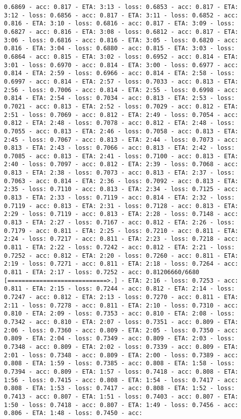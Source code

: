\documentclass[11pt]{article}
\begin{document}
\begin{Verbatim}[commandchars=\\\{\}]
0.6869 - acc: 0.817 - ETA: 3:13 - loss: 0.6853 - acc: 0.817 - ETA: 3:12 - loss: 0.6856 - acc: 0.817 - ETA: 3:11 - loss: 0.6852 - acc: 0.816 - ETA: 3:10 - loss: 0.6816 - acc: 0.817 - ETA: 3:09 - loss: 0.6827 - acc: 0.816 - ETA: 3:08 - loss: 0.6812 - acc: 0.817 - ETA: 3:06 - loss: 0.6816 - acc: 0.816 - ETA: 3:05 - loss: 0.6820 - acc: 0.816 - ETA: 3:04 - loss: 0.6880 - acc: 0.815 - ETA: 3:03 - loss: 0.6864 - acc: 0.815 - ETA: 3:02 - loss: 0.6952 - acc: 0.814 - ETA: 3:01 - loss: 0.6970 - acc: 0.814 - ETA: 3:00 - loss: 0.6977 - acc: 0.814 - ETA: 2:59 - loss: 0.6966 - acc: 0.814 - ETA: 2:58 - loss: 0.6997 - acc: 0.814 - ETA: 2:57 - loss: 0.7033 - acc: 0.813 - ETA: 2:56 - loss: 0.7006 - acc: 0.814 - ETA: 2:55 - loss: 0.6998 - acc: 0.814 - ETA: 2:54 - loss: 0.7034 - acc: 0.813 - ETA: 2:53 - loss: 0.7021 - acc: 0.813 - ETA: 2:52 - loss: 0.7029 - acc: 0.812 - ETA: 2:51 - loss: 0.7069 - acc: 0.812 - ETA: 2:49 - loss: 0.7054 - acc: 0.812 - ETA: 2:48 - loss: 0.7078 - acc: 0.812 - ETA: 2:48 - loss: 0.7055 - acc: 0.813 - ETA: 2:46 - loss: 0.7058 - acc: 0.813 - ETA: 2:45 - loss: 0.7067 - acc: 0.813 - ETA: 2:44 - loss: 0.7073 - acc: 0.813 - ETA: 2:43 - loss: 0.7066 - acc: 0.813 - ETA: 2:42 - loss: 0.7085 - acc: 0.813 - ETA: 2:41 - loss: 0.7100 - acc: 0.813 - ETA: 2:40 - loss: 0.7097 - acc: 0.812 - ETA: 2:39 - loss: 0.7068 - acc: 0.813 - ETA: 2:38 - loss: 0.7073 - acc: 0.813 - ETA: 2:37 - loss: 0.7063 - acc: 0.814 - ETA: 2:36 - loss: 0.7092 - acc: 0.813 - ETA: 2:35 - loss: 0.7110 - acc: 0.813 - ETA: 2:34 - loss: 0.7125 - acc: 0.813 - ETA: 2:33 - loss: 0.7119 - acc: 0.814 - ETA: 2:32 - loss: 0.7119 - acc: 0.813 - ETA: 2:31 - loss: 0.7128 - acc: 0.813 - ETA: 2:29 - loss: 0.7119 - acc: 0.813 - ETA: 2:28 - loss: 0.7148 - acc: 0.813 - ETA: 2:27 - loss: 0.7167 - acc: 0.812 - ETA: 2:26 - loss: 0.7179 - acc: 0.811 - ETA: 2:25 - loss: 0.7210 - acc: 0.811 - ETA: 2:24 - loss: 0.7217 - acc: 0.811 - ETA: 2:23 - loss: 0.7218 - acc: 0.811 - ETA: 2:22 - loss: 0.7242 - acc: 0.812 - ETA: 2:21 - loss: 0.7252 - acc: 0.812 - ETA: 2:20 - loss: 0.7260 - acc: 0.811 - ETA: 2:19 - loss: 0.7271 - acc: 0.811 - ETA: 2:18 - loss: 0.7264 - acc: 0.811 - ETA: 2:17 - loss: 0.7252 - acc: 0.81206660/6680 [============================>.] - ETA: 2:16 - loss: 0.7253 - acc: 0.811 - ETA: 2:15 - loss: 0.7244 - acc: 0.812 - ETA: 2:14 - loss: 0.7247 - acc: 0.812 - ETA: 2:13 - loss: 0.7270 - acc: 0.811 - ETA: 2:11 - loss: 0.7278 - acc: 0.811 - ETA: 2:10 - loss: 0.7310 - acc: 0.810 - ETA: 2:09 - loss: 0.7353 - acc: 0.810 - ETA: 2:08 - loss: 0.7342 - acc: 0.810 - ETA: 2:07 - loss: 0.7351 - acc: 0.809 - ETA: 2:06 - loss: 0.7360 - acc: 0.809 - ETA: 2:05 - loss: 0.7350 - acc: 0.809 - ETA: 2:04 - loss: 0.7349 - acc: 0.809 - ETA: 2:03 - loss: 0.7348 - acc: 0.809 - ETA: 2:02 - loss: 0.7339 - acc: 0.809 - ETA: 2:01 - loss: 0.7348 - acc: 0.809 - ETA: 2:00 - loss: 0.7389 - acc: 0.808 - ETA: 1:59 - loss: 0.7385 - acc: 0.808 - ETA: 1:58 - loss: 0.7394 - acc: 0.809 - ETA: 1:57 - loss: 0.7418 - acc: 0.808 - ETA: 1:56 - loss: 0.7415 - acc: 0.808 - ETA: 1:54 - loss: 0.7417 - acc: 0.808 - ETA: 1:53 - loss: 0.7417 - acc: 0.808 - ETA: 1:52 - loss: 0.7413 - acc: 0.807 - ETA: 1:51 - loss: 0.7403 - acc: 0.807 - ETA: 1:50 - loss: 0.7418 - acc: 0.807 - ETA: 1:49 - loss: 0.7456 - acc: 0.806 - ETA: 1:48 - loss: 0.7450 - acc: 
\end{Verbatim}
\end{document}
